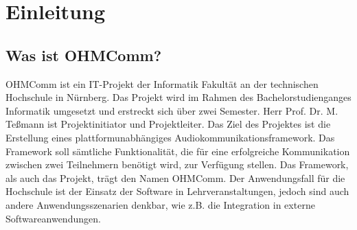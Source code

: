 \chapter{Einleitung}
\section{Was ist OHMComm?}
OHMComm ist ein IT-Projekt der Informatik Fakultät an der technischen Hochschule in Nürnberg. Das Projekt wird im Rahmen des Bachelorstudienganges Informatik umgesetzt und erstreckt sich über zwei Semester. Herr Prof. Dr. M. Teßmann ist Projektinitiator und Projektleiter. Das Ziel des Projektes ist die Erstellung eines plattformunabhängiges Audiokommunikationsframework. Das Framework soll sämtliche Funktionalität, die für eine erfolgreiche Kommunikation zwischen zwei Teilnehmern benötigt wird, zur Verfügung stellen. Das Framework, als auch das Projekt, trägt den Namen OHMComm. Der Anwendungsfall für die Hochschule ist der Einsatz der Software in Lehrveranstaltungen, jedoch sind auch andere Anwendungsszenarien denkbar, wie z.B. die Integration in externe Softwareanwendungen.

